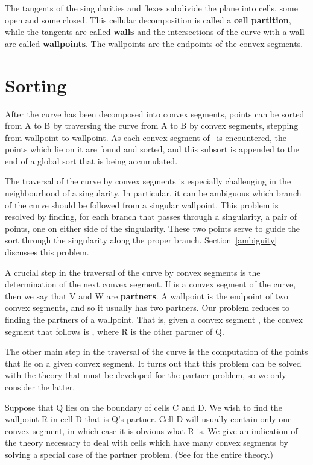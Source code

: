 The tangents of the singularities and flexes subdivide the plane into cells,
some open and some closed.
This cellular decomposition is called a {\bf cell partition}, 
while the tangents
are called {\bf walls} 
and the intersections of the curve with a wall are called
{\bf wallpoints}.
The wallpoints are the endpoints of the convex segments.
%
\section{Sorting}

\tab After the curve has been decomposed into convex segments,
points can be sorted from A to B by traversing the curve from A to B
by convex segments, stepping from wallpoint to wallpoint.
As each convex segment of \ is encountered, 
the points which lie on it are found and sorted, and this subsort is appended
to the end of a global sort that is being accumulated.

The traversal of the curve by convex segments is especially challenging in 
the neighbourhood of a singularity.
In particular, it can be ambiguous which branch of the curve should be
followed from a singular wallpoint.
This problem is resolved by finding,
for each branch that passes through a singularity, a pair of points,
one on either side of the singularity.
These two points serve to guide the sort through the singularity along
the proper branch.
Section~\ref{ambiguity} discusses this problem.

A crucial step in the traversal of the curve by convex segments is the
determination of the next convex segment.
If  is a convex segment of the curve, then we say that V and W
are {\bf partners}.
A wallpoint is the endpoint of two convex segments, and so it usually has
two partners. 
Our problem reduces to finding the partners of a wallpoint.
That is, given a convex segment , the convex segment that follows
 is , where R is the other partner of Q.

The other main step in the traversal of the curve is the computation of the 
points that lie on a given convex segment.
It turns out that this problem can be solved with the theory that must
be developed for the partner problem, so we only consider the latter.

Suppose that Q lies on the boundary of cells C and D.
We wish to find the wallpoint R in cell D that is Q's partner.
Cell D will usually contain only one convex segment, in which case it is 
obvious what R is.
We give an indication of the theory necessary to deal with cells which
have many convex segments by solving a special case of the partner
problem. 
(See  \cite[Chapter 3]{john} for the entire theory.)

